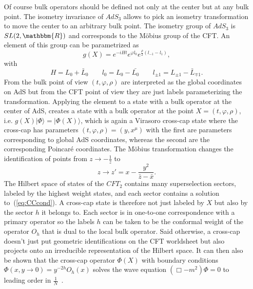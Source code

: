 \documentclass{PoS}
\newcommand{\ket}[1]{|#1\rangle}
\newcommand{\LF}{\left(}
\newcommand{\RF}{\right)}
\begin{document}
Of course bulk operators should be defined not only at the center but at any bulk point. The isometry invariance of $AdS_3$ allows to pick an isometry transformation to move the center to an arbitrary bulk point. The isometry group of $AdS_3$ is $SL(2,\mathbbm{R})$ and corresponds to the M\"obius group of the CFT. An element of this group can be parametrized as
\begin{equation}
g(X) = e^{-iHt} e^{\varphi l_0} e^{\frac{\rho}{2}\LF l_{-1} - l_{1}\RF},
\end{equation}
with
\begin{equation}
H = L_0 + \bar{L}_0 \qquad l_0 = L_0- \bar{L_0} \qquad l_{\pm 1} = L_{\pm 1} - \bar{L}_{\mp 1}.
\end{equation}
From the bulk point of view $(t,\varphi,\rho)$ are interpreted as the global coordinates on AdS but from the CFT point of view they are just labels parameterizing the transformation. Applying the element to a state with a bulk operator at the center of AdS, creates a state with a bulk operator at the point $X=(t,\varphi,\rho)$, i.e. $g(X)\ket{\Phi} = \ket{\Phi(X)}$, which is again a Virasoro cross-cap state where the cross-cap has parameters $(t,\varphi,\rho)=(y,x^\mu)$ with the first are parameters corresponding to global AdS coordinates, whereas the second are the corresponding Poincar\'e coordinates. The M\"obius transformation changes the identification of points from $z\rightarrow -\frac{1}{\bar{z}}$ to 
\begin{equation}
z\rightarrow z' = x - \frac{y^2}{\bar{z}-\bar{x}}.
\end{equation}
The Hilbert space of states of the $CFT_2$ contains many superselection sectors, labeled by the highest weight states, and each sector contains a solution to~(\ref{eq:CCcond}). A cross-cap state is therefore not just labeled by $X$ but also by the sector $h$ it belongs to. Each sector is in one-to-one correspondence with a primary operator so the labels $h$ can be taken to be the conformal weight of the operator $O_h$ that is dual to the local bulk operator. Said otherwise, a cross-cap doesn't just put geometric identifications on the CFT worldsheet but also projects onto an irreducible representation of the Hilbert space. It can then also be shown that the cross-cap operator $\Phi(X)$ with boundary conditions $\Phi(x,y\rightarrow 0) = y^{-2h} O_h(x)$ solves the wave equation $(\Box - m^2)\Phi = 0$ to leading order in $\frac{1}{N}$~\cite{Nakayama:2015mva,Lewkowycz:2016ukf}. \\
 
\end{document}
